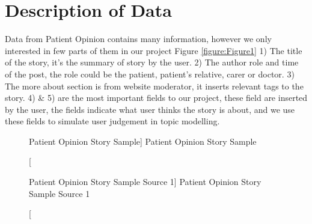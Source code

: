 \documentclass[11pt,twoside]{report}
\begin{document}
\section{Description of Data}
Data from Patient Opinion contains many information, however we only interested in few parts of them in our project Figure \ref{figure:Figure1} 1) The title of the story, it’s the summary of story by the user. 2) The author role and time of the post, the role could be the patient, patient’s relative, carer or doctor. 3) The more about section is from website moderator, it inserts relevant tags to the story. 4) \& 5) are the most important fields to our project, these field are inserted by the user, the fields indicate what user thinks the story is about, and we use these fields to simulate user judgement in topic modelling. 
\begin{figure}[h]
    \begin{center}
    \caption
    [Patient Opinion Story Sample]
    {
    Patient Opinion Story Sample
    \label{Figure1}
    }
    \end{center}
\end{figure}

\begin{figure}[h]
    \begin{center}
    \caption
    [Patient Opinion Story Sample Source 1]
    {
    Patient Opinion Story Sample Source 1
    \label{Figure2}
    }
    \end{center}
\end{figure}
\end{document}
